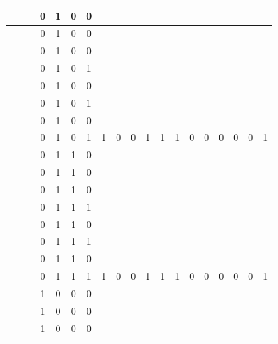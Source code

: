 \begin{table}[!tb]
\begin{tabular}{|c|c|c|c|c|c|c|c|c|c|c|c|c|c|c|c|c|c|c|}
        \rowcolor{red!40}  &  &  & 0 & 1 & 0 & 0 &  &  &  &  &  &  &  &  &  &  &  &  \\ \hline
        \rowcolor{red!40}  &  &  & 0 & 1 & 0 & 0 &  &  &  &  &  &  &  &  &  &  &  &  \\ \hline
        \rowcolor{red!40}  &  &  & 0 & 1 & 0 & 0 &  &  &  &  &  &  &  &  &  &  &  &  \\ \hline
        \rowcolor{red!40}  &  &  & 0 & 1 & 0 & 1 &  &  &  &  &  &  &  &  &  &  &  &  \\ \hline
        \rowcolor{red!40}  &  &  & 0 & 1 & 0 & 0 &  &  &  &  &  &  &  &  &  &  &  &  \\ \hline
        \rowcolor{red!40}  &  &  & 0 & 1 & 0 & 1 &  &  &  &  &  &  &  &  &  &  &  &  \\ \hline
        \rowcolor{red!40}  &  &  & 0 & 1 & 0 & 0 &  &  &  &  &  &  &  &  &  &  &  &  \\ \hline
        \rowcolor{red!40}  &  &  & 0 & 1 & 0 & 1 & 1 & 0 & 0 & 1 & 1 & 1 & 0 & 0 & 0 & 0 & 0 & 1 \\ \hline
        \rowcolor{green!40}  &  &  & 0 & 1 & 1 & 0 &  &  &  &  &  &  &  &  &  &  &  &  \\ \hline
        \rowcolor{green!40}  &  &  & 0 & 1 & 1 & 0 &  &  &  &  &  &  &  &  &  &  &  &  \\ \hline
        \rowcolor{green!40}  &  &  & 0 & 1 & 1 & 0 &  &  &  &  &  &  &  &  &  &  &  &  \\ \hline
        \rowcolor{green!40}  &  &  & 0 & 1 & 1 & 1 &  &  &  &  &  &  &  &  &  &  &  &  \\ \hline
        \rowcolor{green!40}  &  &  & 0 & 1 & 1 & 0 &  &  &  &  &  &  &  &  &  &  &  &  \\ \hline
        \rowcolor{green!40}  &  &  & 0 & 1 & 1 & 1 &  &  &  &  &  &  &  &  &  &  &  &  \\ \hline
        \rowcolor{green!40}  &  &  & 0 & 1 & 1 & 0 &  &  &  &  &  &  &  &  &  &  &  &  \\ \hline
        \rowcolor{green!40}  &  &  & 0 & 1 & 1 & 1 & 1 & 0 & 0 & 1 & 1 & 1 & 0 & 0 & 0 & 0 & 0 & 1 \\ \hline
        \rowcolor{yellow!40}  &  &  & 1 & 0 & 0 & 0 &  &  &  &  &  &  &  &  &  &  &  &  \\ \hline
        \rowcolor{yellow!40}  &  &  & 1 & 0 & 0 & 0 &  &  &  &  &  &  &  &  &  &  &  &  \\ \hline
        \rowcolor{yellow!40}  &  &  & 1 & 0 & 0 & 0 &  &  &  &  &  &  &  &  &  &  &  &  \\ \hline

\end{tabular}
\end{table}
